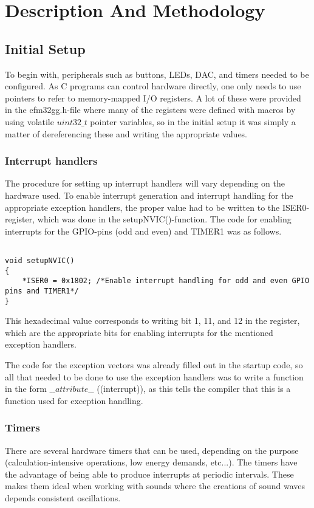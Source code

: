 \section{Description And Methodology}


\subsection{Initial Setup}
To begin with, peripherals such as buttons, LEDs, DAC, and timers needed to be configured. As C programs can control hardware directly, one only needs to use pointers to refer to memory-mapped I/O registers. A lot of these were provided in the efm32gg.h-file where many of the registers were defined with macros by using volatile $uint32\_t$ pointer variables, so in the initial setup it was simply a matter of dereferencing these and writing the appropriate values.


\subsubsection{Interrupt handlers}
The procedure for setting up interrupt handlers will vary depending on the hardware used. To enable interrupt generation and interrupt handling for the appropriate exception handlers, the proper value had to be written to the ISER0-register, which was done in the setupNVIC()-function. The code for enabling interrupts for the GPIO-pins (odd and even) and TIMER1 was as follows.

\begin{lstlisting}

void setupNVIC()
{
 	*ISER0 = 0x1802; /*Enable interrupt handling for odd and even GPIO pins and TIMER1*/
}

\end{lstlisting} 
This hexadecimal value corresponds to writing bit 1, 11, and 12 in the register, which are the appropriate bits for enabling interrupts for the mentioned exception handlers.

The code for the exception vectors was already filled out in the startup code, so all that needed to be done to use the exception handlers was to write a function in the form $\_\_attribute\_\_$ ((interrupt)), as this tells the compiler that this is a function used for exception handling.


\subsubsection{Timers}
There are several hardware timers that can be used, depending on the purpose (calculation-intensive operations, low energy demands, etc...). The timers have the advantage of being able to produce interrupts at periodic intervals. These makes them ideal when working with sounds where the creations of sound waves depends consistent oscillations. 


